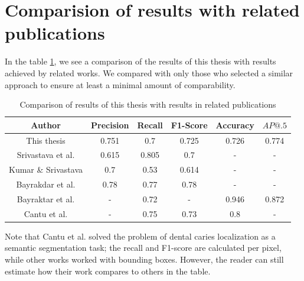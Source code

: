 \section{Comparision of results with related publications}
\label{sec:result_comparision_with_lit}
In the table \ref{tab:results_comparison}, we see a comparison of the results of this thesis with results achieved by related works. We compared with only those who selected a similar approach to ensure at least a minimal amount of comparability.

\begin{table}
    \centering
    \begin{tabular}{|c|c|c|c|c|c|}
        \hline
        Author                                                                 & Precision & Recall & F1-Score & Accuracy & $AP@.5$ \\ \hline
        This thesis                                                            & 0.751     & 0.7    & 0.725    & 0.726    & 0.774   \\ \hline
        Srivastava et al. \cite{Srivastava2017}                                & 0.615     & 0.805  & 0.7      & -        & -       \\ \hline
        Kumar                                   \& Srivastava \cite{Kumar2018} & 0.7       & 0.53   & 0.614    & -        & -       \\ \hline
        Bayrakdar et al. \cite{Bayrakdar2021}                                  & 0.78      & 0.77   & 0.78     & -        & -       \\ \hline
        Bayraktar et al. \cite{Bayraktar2021}                                  & -         & 0.72   & -        & 0.946    & 0.872   \\ \hline
        Cantu et al. \cite{Cantu2020}                                          & -         & 0.75   & 0.73     & 0.8      & -       \\ \hline
    \end{tabular}
    \caption{Comparison of results of this thesis with results in related publications}
    \label{tab:results_comparison}
\end{table}

Note that Cantu et al. \cite{Cantu2020} solved the problem of dental caries localization as a semantic segmentation task; the recall and F1-score are calculated per pixel, while other works worked with bounding boxes. However, the reader can still estimate how their work compares to others in the table.
